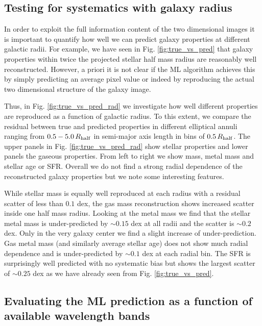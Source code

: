 \documentclass[conference]{IEEEtran}
\begin{document}
\subsection{Testing for systematics with galaxy radius}
\label{sec:radial}

In order to exploit the full information content of the two dimensional images it is important to quantify how well we can predict galaxy properties at different galactic radii. For example, we have seen in Fig. \ref{fig:true_vs_pred} that galaxy properties within twice the projected stellar half mass radius are reasonably well reconstructed. However, a priori it is not clear if the ML algorithm achieves this by simply predicting an average pixel value or indeed by reproducing the actual two dimensional structure of the galaxy image. 

Thus, in Fig. \ref{fig:true_vs_pred_rad} we investigate how well different properties are reproduced as a function of galactic radius. To this extent, we compare the residual between true and predicted properties in different elliptical annuli ranging from $0.5-5.0\, R_{\rm half}$ in semi-major axis length in bins of $0.5\, R_{\rm half}$. The upper panels in Fig. \ref{fig:true_vs_pred_rad} show stellar properties and lower panels the gaseous properties. From left to right we show mass, metal mass and stellar age or SFR. Overall we do not find a strong radial dependence of the reconstructed galaxy properties but we note some interesting features.

While stellar mass is equally well reproduced at each radius with a residual scatter of less than $0.1$ dex, the gas mass reconstruction shows increased scatter inside one half mass radius. Looking at the metal mass we find that the stellar metal mass is under-predicted by $\sim0.15$ dex at all radii and the scatter is $\sim0.2$ dex. Only in the very galaxy center we find a slight increase of under-prediction. Gas metal mass (and similarly average stellar age) does not show much radial dependence and is under-predicted by $\sim0.1$ dex at each radial bin.  
The SFR is surprisingly well predicted with no systematic bias but shows the largest scatter of $\sim0.25$ dex as we have already seen from Fig. \ref{fig:true_vs_pred}.


\subsection{Evaluating the ML prediction as a function of available wavelength bands}
\label{sec:bands}
\end{document}
